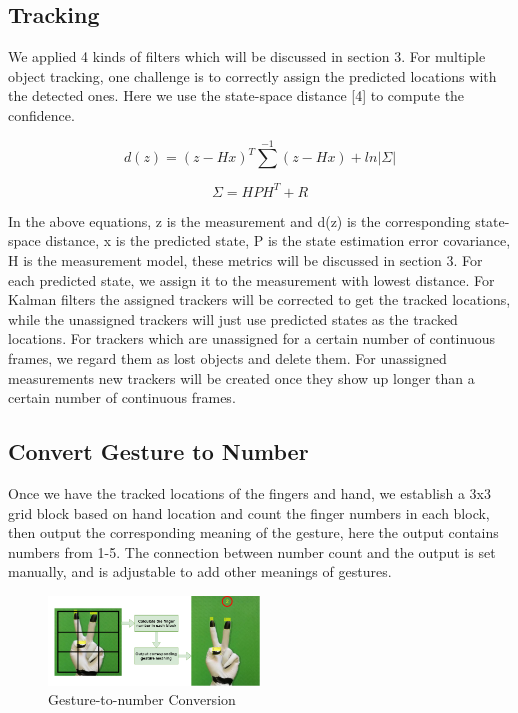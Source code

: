 \documentclass[10pt,twocolumn,letterpaper]{article}
\begin{document}
\subsection{Tracking}
We applied 4 kinds of filters which will be discussed in section 3. For multiple object tracking, one challenge is to correctly assign the predicted locations with the detected ones. Here we use the state-space distance [4] to compute the confidence.

\begin{equation}
d(z)=(z-Hx)^T\sum^{-1} (z-Hx)+ln|\Sigma|
\end{equation}

\begin{equation}
\Sigma=HPH^T+R
\end{equation}

In the above equations, z is the measurement and d(z) is the corresponding state-space distance, x is the predicted state, P is the state estimation error covariance, H is the measurement model, these metrics will be discussed in section 3. For each predicted state, we assign it to the measurement with lowest distance. For Kalman filters the assigned trackers will be corrected to get the tracked locations, while the unassigned trackers will just use predicted states as the tracked locations. For trackers which are unassigned for a certain number of continuous frames, we regard them as lost objects and delete them. For unassigned measurements new trackers will be created once they show up longer than a certain number of continuous frames.

\subsection{Convert Gesture to Number}

Once we have the tracked locations of the fingers and hand, we establish a 3x3 grid block based on hand location and count the finger numbers in each block, then output the corresponding meaning of the gesture, here the output contains numbers from 1-5. The connection between number count and the output is set manually, and is adjustable to add other meanings of gestures.

\begin{figure}
     \centering
       \includegraphics[width=0.5\textwidth]{duchen_2.png}
         \caption{\small{Gesture-to-number Conversion}}
 \end{figure}
\end{document}
